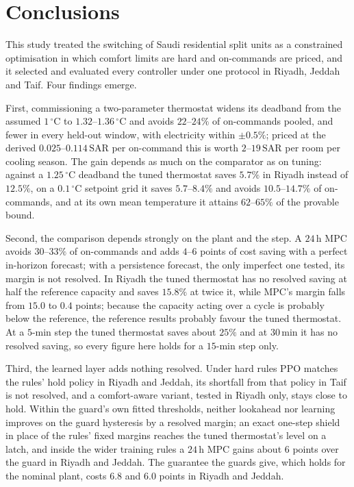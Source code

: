 \documentclass[pdflatex,sn-mathphys-num,iicol]{sn-jnl}
\theoremstyle{thmstyleone}\newtheorem{proposition}{Proposition}\newtheorem{corollary}{Corollary}
\theoremstyle{thmstyletwo}\newtheorem{remark}{Remark}\newtheorem{observation}{Observation}
\theoremstyle{thmstylethree}\newtheorem{definition}{Definition}
\newcommand{\SAR}{\text{SAR}}
\begin{document}
\section{Conclusions}
\label{sec:conclusion}

This study treated the switching of Saudi residential split units as a constrained optimisation in which comfort limits are hard and on-commands are priced, and it selected and evaluated every controller under one protocol in Riyadh, Jeddah and Taif. Four findings emerge.

First, commissioning a two-parameter thermostat widens its deadband from the assumed $1\,^\circ$C to $1.32$--$1.36\,^\circ$C and avoids $22$--$24\%$ of on-commands pooled, and fewer in every held-out window, with electricity within $\pm0.5\%$; priced at the derived $0.025$--$0.114\,\SAR$ per on-command this is worth $2$--$19\,\SAR$ per room per cooling season. The gain depends as much on the comparator as on tuning: against a $1.25\,^\circ$C deadband the tuned thermostat saves $5.7\%$ in Riyadh instead of $12.5\%$, on a $0.1\,^\circ$C setpoint grid it saves $5.7$--$8.4\%$ and avoids $10.5$--$14.7\%$ of on-commands, and at its own mean temperature it attains $62$--$65\%$ of the provable bound.

Second, the comparison depends strongly on the plant and the step. A $24\,$h MPC avoids $30$--$33\%$ of on-commands and adds $4$--$6$ points of cost saving with a perfect in-horizon forecast; with a persistence forecast, the only imperfect one tested, its margin is not resolved. In Riyadh the tuned thermostat has no resolved saving at half the reference capacity and saves $15.8\%$ at twice it, while MPC's margin falls from $15.0$ to $0.4$ points; because the capacity acting over a cycle is probably below the reference, the reference results probably favour the tuned thermostat. At a $5$-min step the tuned thermostat saves about $25\%$ and at $30\,$min it has no resolved saving, so every figure here holds for a $15$-min step only.

Third, the learned layer adds nothing resolved. Under hard rules PPO matches the rules' hold policy in Riyadh and Jeddah, its shortfall from that policy in Taif is not resolved, and a comfort-aware variant, tested in Riyadh only, stays close to hold. Within the guard's own fitted thresholds, neither lookahead nor learning improves on the guard hysteresis by a resolved margin; an exact one-step shield in place of the rules' fixed margins reaches the tuned thermostat's level on a latch, and inside the wider training rules a $24\,$h MPC gains about $6$ points over the guard in Riyadh and Jeddah. The guarantee the guards give, which holds for the nominal plant, costs $6.8$ and $6.0$ points in Riyadh and Jeddah.
\end{document}
